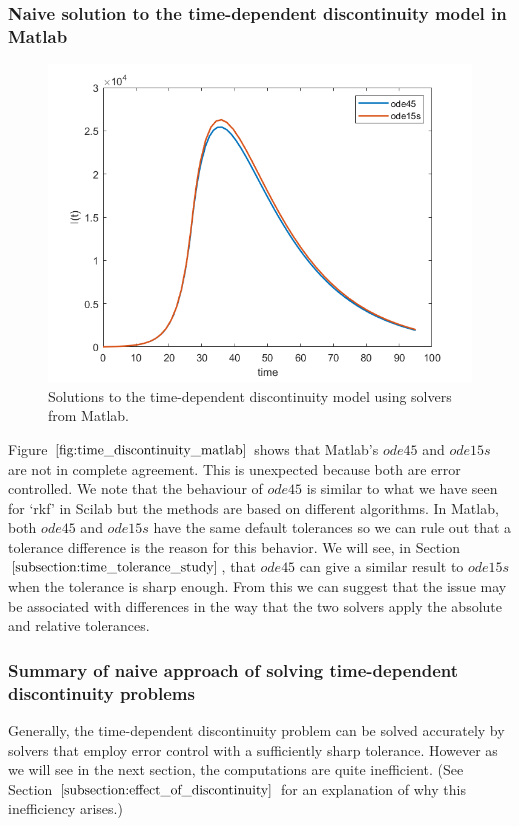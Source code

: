 \subsubsection{Naive solution to the time-dependent discontinuity model in Matlab}
\begin{figure}[H]
\centering
\includegraphics[width=0.7\linewidth]{./figures/time_discontinuity_matlab}
\caption{Solutions to the time-dependent discontinuity model using solvers from Matlab.}
\label{fig:time_discontinuity_matlab}
\end{figure}
Figure $\ref{fig:time_discontinuity_matlab}$ shows that Matlab's $ode45$ and $ode15s$ are not in complete agreement. This is unexpected because both are error controlled. We note that the behaviour of $ode45$ is similar to what we have seen for `rkf' in Scilab but the methods are based on different algorithms. In Matlab, both $ode45$ and $ode15s$ have the same default tolerances so we can rule out that a tolerance difference is the reason for this behavior. We will see, in Section $\ref{subsection:time_tolerance_study}$, that $ode45$ can give a similar result to $ode15s$  when the tolerance is sharp enough. From this we can suggest that the issue may be associated with differences in the way that the two solvers apply the absolute and relative tolerances.

\subsubsection{Summary of naive approach of 
solving time-dependent discontinuity problems}
Generally, the time-dependent discontinuity problem can be solved accurately by solvers that employ error control with a sufficiently sharp tolerance. However as we will see in the next section, the computations are quite inefficient. (See Section $\ref{subsection:effect_of_discontinuity}$ for an explanation of why this inefficiency arises.)


